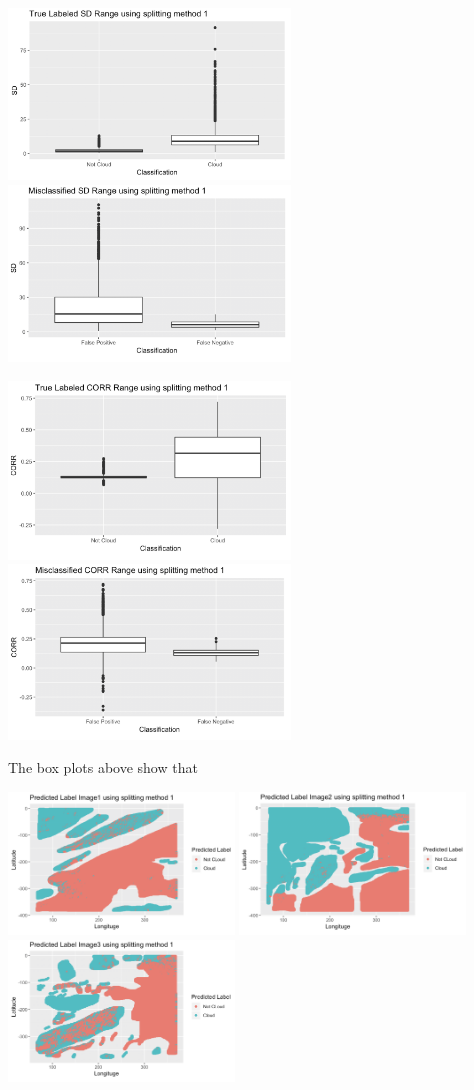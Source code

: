 \documentclass[11pt]{article}
\begin{document}
\includegraphics[width = 7.5cm]{4(d)sd1}
\includegraphics[width = 7.5cm]{4(d)sd2}

\includegraphics[width = 7.5cm]{4(d)corr1}
\includegraphics[width = 7.5cm]{4(d)corr2}

The box plots above show that 

\includegraphics[width = 6cm]{4(d)image1}
\includegraphics[width = 6cm]{4(d)image2}
\includegraphics[width = 6cm]{4(d)image3}
\end{document}
